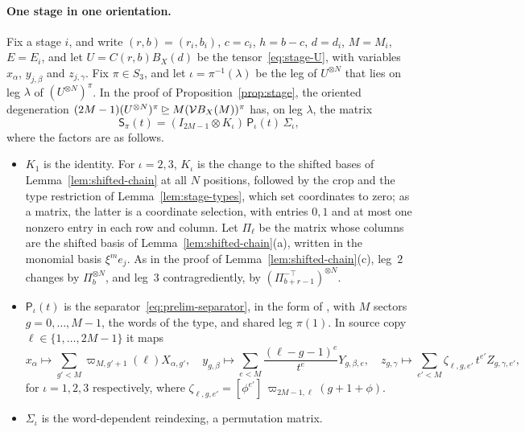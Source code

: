\paragraph{One stage in one orientation.}
Fix a stage \(i\), and write \((r,b)=(r_i,b_i)\), \(c=c_i\), \(h=b-c\),
\(d=d_i\), \(M=M_i\), \(E=E_i\), and let \(U=C(r,b)B_X(d)\) be the
tensor~\eqref{eq:stage-U}, with variables \(x_\alpha\), \(y_{j,\beta}\) and
\(z_{j,\gamma}\). Fix
\(\pi\in S_3\), and let \(\iota=\pi^{-1}(\lambda)\) be the leg of
\(U^{\otimes N}\) that lies on leg \(\lambda\) of \((U^{\otimes N})^\pi\).
In the proof of Proposition~\ref{prop:stage}, the oriented degeneration
\((2M-1)(U^{\otimes N})^\pi\unrhd M(\mathcal VB_X(M))^\pi\) has, on leg
\(\lambda\), the matrix
\[
 \mathsf S_\pi(t)=(I_{2M-1}\otimes K_\iota)\,\mathsf P_\iota(t)\,\Sigma_\iota ,
\]
where the factors are as follows.
\begin{itemize}
\item \(K_1\) is the identity. For \(\iota=2,3\), \(K_\iota\) is the
 change to the shifted bases of Lemma~\ref{lem:shifted-chain} at all \(N\)
 positions, followed by the crop and the type restriction of
 Lemma~\ref{lem:stage-types}, which set coordinates to zero; as a matrix,
 the latter is a coordinate selection, with entries \(0,1\) and at most
 one nonzero entry in each row and column. Let \(\Pi_\ell\) be the matrix
 whose columns are the shifted basis of
 Lemma~\ref{lem:shifted-chain}(a), written in the monomial basis
 \(\xi^me_j\). As in the proof of Lemma~\ref{lem:shifted-chain}(c),
 leg~\(2\) changes by \(\Pi_b^{\otimes N}\), and leg~\(3\)
 contragrediently, by \((\Pi_{b+r-1}^{-\top})^{\otimes N}\).
\item \(\mathsf P_\iota(t)\) is the separator~\eqref{eq:prelim-separator},
 in the form of \citep[Lemma~9.1(b)]{FinCon26}, with \(M\) sectors
 \(g=0,\ldots,M-1\), the words of the type, and shared leg \(\pi(1)\). In
 source copy \(\ell\in\{1,\ldots,2M-1\}\) it maps
 \[
 x_\alpha\mapsto\sum_{g'<M}\varpi_{M,g'+1}(\ell)X_{\alpha,g'},\quad
 y_{g,\beta}\mapsto\sum_{e<M}\frac{(\ell-g-1)^e}{t^e}Y_{g,\beta,e},\quad
 z_{g,\gamma}\mapsto\sum_{e'<M}\zeta_{\ell,g,e'}\,t^{e'}Z_{g,\gamma,e'},
 \]
 for \(\iota=1,2,3\) respectively, where
 \(\zeta_{\ell,g,e'}=[\phi^{e'}]\,\varpi_{2M-1,\ell}(g+1+\phi)\).
\item \(\Sigma_\iota\) is the word-dependent reindexing, a permutation
 matrix.
\end{itemize}

